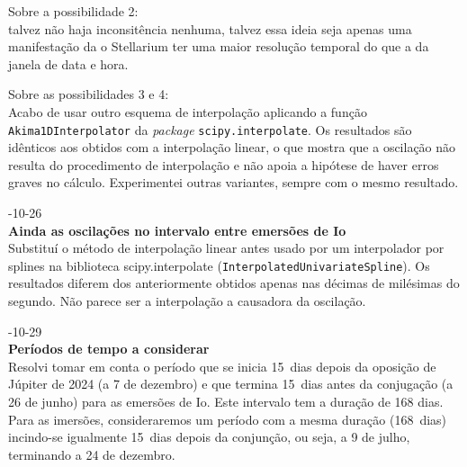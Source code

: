 \documentclass[]{article}
\newcommand{\newlog}[2]{%
  \par
  \vspace{\baselineskip}
  \noindent
  #1\\
  \textbf{#2}\\
}
\begin{document}
\noindent
Sobre a possibilidade 2:\\
talvez não haja inconsitência nenhuma, talvez essa ideia seja apenas uma
manifestação da o Stellarium ter uma maior resolução temporal do que a da janela
de data e hora.

\noindent
Sobre as possibilidades 3 e 4:\\
Acabo de usar outro esquema de interpolação aplicando a função
\texttt{Akima1DInterpolator} da \textsl{package} \texttt{scipy.interpolate}. Os resultados são
idênticos aos obtidos com a interpolação linear, o que mostra que a oscilação
não resulta do procedimento de interpolação e não apoia a hipótese de haver
erros graves no cálculo. Experimentei outras variantes, sempre com o mesmo
resultado.


\newlog{2024-10-26}{Ainda as oscilações no intervalo entre emersões de Io}
Substituí o método de interpolação linear antes usado por um interpolador por
splines na biblioteca scipy.interpolate (\texttt{InterpolatedUnivariateSpline}).
Os resultados diferem dos anteriormente obtidos apenas nas décimas de milésimas
do segundo. Não parece ser a interpolação a causadora da oscilação. 

\newlog{2024-10-29}{Períodos de tempo a considerar}
Resolvi tomar em conta o período que se inicia 15~dias depois da oposição de
Júpiter de 2024 (a 7 de dezembro) e que termina 15~dias antes da conjugação (a
26 de junho) para as emersões de Io. Este intervalo tem a duração de 168 dias.
Para as imersões, consideraremos um período com a mesma duração (168~dias)
incindo-se igualmente 15~dias depois da conjunção, ou seja, a 9 de julho,
terminando a 24 de dezembro.
\end{document}
